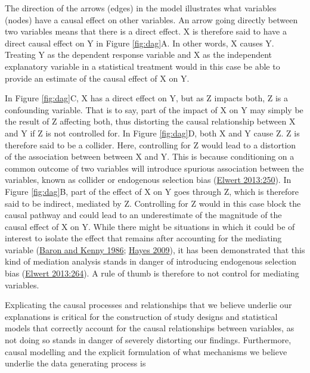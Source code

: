 \documentclass[
  12pt,
  a4paper,
  oneside]{book}
\begin{document}
The direction of the arrows (edges) in the model illustrates what variables (nodes) have a causal effect on other variables. An arrow going directly between two variables means that there is a direct effect. X is therefore said to have a direct causal effect on Y in Figure \ref{fig:dag}A. In other words, X causes Y. Treating Y as the dependent response variable and X as the independent explanatory variable in a statistical treatment would in this case be able to provide an estimate of the causal effect of X on Y.

In Figure \ref{fig:dag}C, X has a direct effect on Y, but as Z impacts both, Z is a confounding variable. That is to say, part of the impact of X on Y may simply be the result of Z affecting both, thus distorting the causal relationship between X and Y if Z is not controlled for. In Figure \ref{fig:dag}D, both X and Y cause Z. Z is therefore said to be a collider. Here, controlling for Z would lead to a distortion of the association between between X and Y. This is because conditioning on a common outcome of two variables will introduce spurious association between the variables, known as collider or endogenous selection bias (\protect\hyperlink{ref-elwert2013}{Elwert 2013:250}). In Figure \ref{fig:dag}B, part of the effect of X on Y goes through Z, which is therefore said to be indirect, mediated by Z. Controlling for Z would in this case block the causal pathway and could lead to an underestimate of the magnitude of the causal effect of X on Y. While there might be situations in which it could be of interest to isolate the effect that remains after accounting for the mediating variable (\protect\hyperlink{ref-baron1986}{Baron and Kenny 1986}; \protect\hyperlink{ref-hayes2009}{Hayes 2009}), it has been demonstrated that this kind of mediation analysis stands in danger of introducing endogenous selection bias (\protect\hyperlink{ref-elwert2013}{Elwert 2013:264}). A rule of thumb is therefore to not control for mediating variables.

Explicating the causal processes and relationships that we believe underlie our explanations is critical for the construction of study designs and statistical models that correctly account for the causal relationships between variables, as not doing so stands in danger of severely distorting our findings. Furthermore, causal modelling and the explicit formulation of what mechanisms we believe underlie the data generating process is
\end{document}

